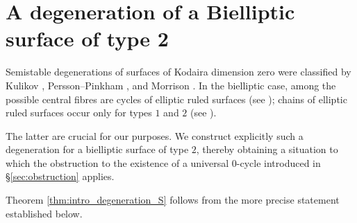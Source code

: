 \documentclass[11pt,letterpaper]{amsart}
\numberwithin{equation}{section}
\theoremstyle{definition}
\theoremstyle{remark}
\begin{document}
\section{A degeneration of a Bielliptic surface of type 2}\label{sec:degen_bielliptic}

 Semistable degenerations of surfaces of Kodaira dimension zero were classified by Kulikov \cite{Kulikov1977}, Persson--Pinkham \cite{persson1981degeneration}, and Morrison \cite{Morrison1981Semistable}. In the bielliptic case, among the possible central fibres are cycles of elliptic ruled surfaces (see \cite[Theorem 1.8 (1.8.2)]{Morrison1981Semistable}); chains of elliptic ruled surfaces occur only for types $1$ and $2$ (see \cite[Theorem 1.8 (1.8.3)(c)]{Morrison1981Semistable}).
\par
The latter are crucial for our purposes. We construct explicitly such a degeneration for a bielliptic surface of type $2$, thereby obtaining a situation to which the obstruction to the existence of a universal $0$-cycle introduced in \S \ref{sec:obstruction} applies.\par Theorem \ref{thm:intro_degeneration_S} follows from the more precise statement established below.
\end{document}
